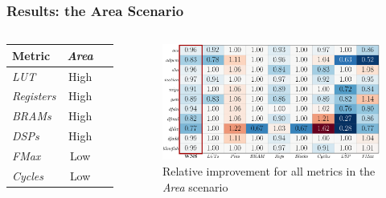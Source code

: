 \documentclass[10pt, compress, xcolor={table,xcdraw,usenames}, aspectratio=169]{beamer}
\begin{document}
\begin{frame}
    \frametitle{Results: the Area Scenario}
    \begin{columns}[T,onlytextwidth]
        \begin{table}[htpb]
            \scriptsize
            \centering
            \begin{tabular}{@{}lcccc@{}}
                \toprule
                Metric & \textit{Area} \\ \midrule
                \textit{LUT} & \cellcolor[HTML]{9B94B6} High \\
                \textit{Registers} & \cellcolor[HTML]{9B94B6} High \\
                \textit{BRAMs} & \cellcolor[HTML]{9B94B6} High \\
                \textit{DSPs} & \cellcolor[HTML]{9B94B6} High \\
                \textit{FMax} & \cellcolor[HTML]{DD9583} Low \\
                \textit{Cycles} & \cellcolor[HTML]{DD9583} Low \\ \bottomrule
            \end{tabular}
        \end{table}

        \begin{figure}[htpb]
            \centering
            \includegraphics[width=0.8\columnwidth]{heatmap_default_stratixV_area}
            \caption{Relative improvement for all metrics in the \textit{Area}
            scenario}
        \end{figure}
    \end{columns}
\end{frame}
\end{document}

